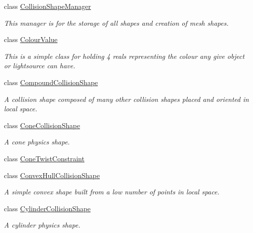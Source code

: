\begin{DoxyCompactItemize}
class \hyperlink{classMezzanine_1_1CollisionShapeManager}{CollisionShapeManager}
\begin{DoxyCompactList}\small\item\em This manager is for the storage of all shapes and creation of mesh shapes. \item\end{DoxyCompactList}\item 
class \hyperlink{classMezzanine_1_1ColourValue}{ColourValue}
\begin{DoxyCompactList}\small\item\em This is a simple class for holding 4 reals representing the colour any give object or lightsource can have. \item\end{DoxyCompactList}\item 
class \hyperlink{classMezzanine_1_1CompoundCollisionShape}{CompoundCollisionShape}
\begin{DoxyCompactList}\small\item\em A collision shape composed of many other collision shapes placed and oriented in local space. \item\end{DoxyCompactList}\item 
class \hyperlink{classMezzanine_1_1ConeCollisionShape}{ConeCollisionShape}
\begin{DoxyCompactList}\small\item\em A cone physics shape. \item\end{DoxyCompactList}\item 
class \hyperlink{classMezzanine_1_1ConeTwistConstraint}{ConeTwistConstraint}
\item 
class \hyperlink{classMezzanine_1_1ConvexHullCollisionShape}{ConvexHullCollisionShape}
\begin{DoxyCompactList}\small\item\em A simple convex shape built from a low number of points in local space. \item\end{DoxyCompactList}\item 
class \hyperlink{classMezzanine_1_1CylinderCollisionShape}{CylinderCollisionShape}
\begin{DoxyCompactList}\small\item\em A cylinder physics shape. \item\end{DoxyCompactList}\item 

\end{DoxyCompactItemize}

